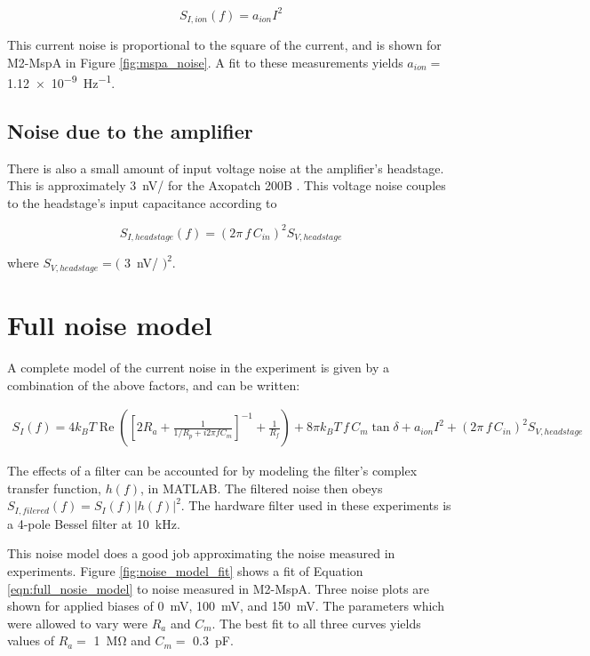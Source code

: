 \begin{equation}
S_{I,ion}(f) = a_{ion} I^2
\label{eqn:ion_number}
\end{equation}

This current noise is proportional to the square of the current, and is shown for M2-MspA in Figure \ref{fig:mspa_noise}.  A fit to these measurements yields $a_{ion} =$ \SI{1.12e-9}{\Hz^{-1}}.


\subsection{Noise due to the amplifier}

There is also a small amount of input voltage noise at the amplifier's headstage.  This is approximately \SI{3}{\nV/\sqrt{\Hz}} for the Axopatch 200B \citep{Sakmann1995}.  This voltage noise couples to the headstage's input capacitance according to

\begin{equation}
S_{I,headstage}(f) = (2 \pi \, f \, C_{in})^2 S_{V,headstage}
\label{eqn:headstage}
\end{equation}

\noindent
where $S_{V,headstage} = ($ \SI{3}{\nV/\sqrt{\Hz}} $)^2$.

\section{Full noise model}

A complete model of the current noise in the experiment is given by a combination of the above factors, and can be written:

\begin{multline}
S_I(f) = 4 k_B T \operatorname{Re} \left( \left[ 2 R_a + \frac{1}{ 1/R_p + i 2 \pi f C_m } \right]^{-1} + \frac{1}{R_f} \right) + 8 \pi k_B T \, f \, C_m \tan \delta + a_{ion} I^2 + (2 \pi \, f \, C_{in})^2 S_{V,headstage}
\label{eqn:full_nosie_model}
\end{multline}

The effects of a filter can be accounted for by modeling the filter's complex transfer function, $h(f)$, in MATLAB.  The filtered noise then obeys $S_{I,filered}(f) = S_I(f) |h(f)|^2$.  The hardware filter used in these experiments is a 4-pole Bessel filter at \SI{10}{\kHz}.

This noise model does a good job approximating the noise measured in experiments.  Figure \ref{fig:noise_model_fit} shows a fit of Equation \ref{eqn:full_nosie_model} to noise measured in M2-MspA.  Three noise plots are shown for applied biases of \SI{0}{\mV}, \SI{100}{\mV}, and \SI{150}{\mV}.  The parameters which were allowed to vary were $R_a$ and $C_m$.  The best fit to all three curves yields values of $R_a = $ \SI{1}{\mega\ohm} and $C_m = $ \SI{0.3}{\pF}.

